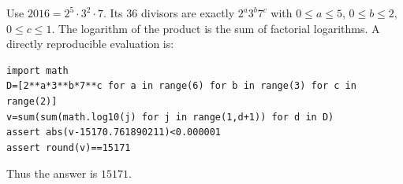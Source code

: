 Use $ 2016=2^5\cdot3^2\cdot7 $. Its 36 divisors are exactly $ 2^a3^b7^c $ with $ 0\le a\le5 $, $ 0\le b\le2 $, $ 0\le c\le1 $. The logarithm of the product is the sum of factorial logarithms. A directly reproducible evaluation is:
\begin{verbatim}
import math
D=[2**a*3**b*7**c for a in range(6) for b in range(3) for c in range(2)]
v=sum(sum(math.log10(j) for j in range(1,d+1)) for d in D)
assert abs(v-15170.761890211)<0.000001
assert round(v)==15171
\end{verbatim}
Thus the answer is $\boxed{15171}$.
